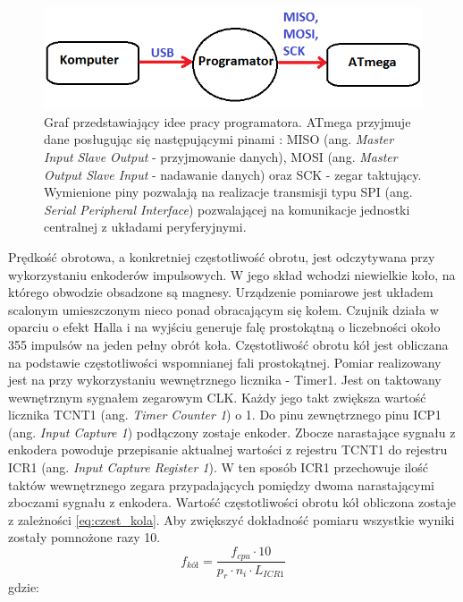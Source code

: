   \begin{figure}[H]
    \begin{center}
      \includegraphics[scale=0.7]{imgs/schemat_prog.png}
 	\caption[Podłączenie programatora.]{\small{Graf przedstawiający idee pracy programatora. ATmega przyjmuje dane posługując się następującymi pinami : MISO (ang. \textit{Master Input Slave Output} - przyjmowanie danych), MOSI (ang. \textit{Master Output Slave Input} - nadawanie danych) oraz SCK - zegar taktujący. Wymienione piny pozwalają na realizacje transmisji typu SPI (ang. \textit{Serial Peripheral Interface}) pozwalającej na komunikacje jednostki centralnej z układami peryferyjnymi.}}
	\label{schem_ster}
    \end{center}
  \end{figure}  
  
Prędkość obrotowa, a konkretniej częstotliwość obrotu, jest odczytywana przy wykorzystaniu enkoderów impulsowych. W jego skład wchodzi niewielkie koło, na którego obwodzie obsadzone są magnesy. Urządzenie pomiarowe jest układem scalonym umieszczonym nieco ponad obracającym się kołem. Czujnik działa w oparciu o efekt Halla i na wyjściu generuje falę prostokątną o liczebności około 355 impulsów na jeden pełny obrót koła. Częstotliwość obrotu kół jest obliczana na podstawie częstotliwości wspomnianej fali prostokątnej. Pomiar realizowany jest na przy wykorzystaniu wewnętrznego licznika - Timer1. Jest on taktowany wewnętrznym sygnałem zegarowym CLK. Każdy jego takt zwiększa wartość licznika TCNT1 (ang. \textit{Timer Counter 1}) o 1. Do pinu zewnętrznego pinu ICP1 (ang. \textit{Input Capture 1}) podłączony zostaje enkoder. Zbocze narastające sygnału z enkodera powoduje przepisanie aktualnej wartości z rejestru TCNT1 do rejestru ICR1 (ang. \textit{Input Capture Register 1}). W ten sposób ICR1 przechowuje ilość taktów wewnętrznego zegara przypadających pomiędzy dwoma narastającymi zboczami sygnału z enkodera. Wartość częstotliwości obrotu kół obliczona zostaje z zależności \ref{eq:czest_kola}. Aby zwiększyć dokładność pomiaru wszystkie wyniki zostały pomnożone razy 10.
\begin{equation}
	f_{kół} =  \frac{f_{cpu} \cdot 10}{p_r \cdot n_i \cdot L_{ICR1} } 
   \label{eq:czest_kola}
 \end{equation}
 gdzie:  
 \begin{equationDescriptor}
 \end{equationDescriptor} 

